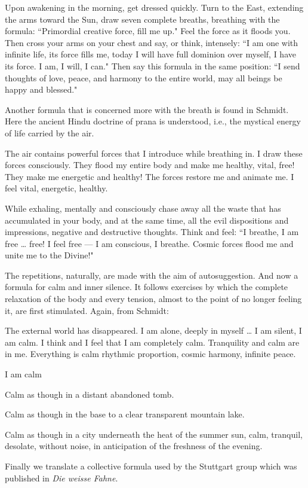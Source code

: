 \begin{quotex}
Upon awakening in the morning, get dressed quickly. Turn to the East, extending the arms toward the Sun, draw seven complete breaths, breathing with the formula: ``Primordial creative force, fill me up." Feel the force as it floods you. Then cross your arms on your chest and say, or think, intensely: ``I am one with infinite life, its force fills me, today I will have full dominion over myself, I have its force. I am, I will, I can." Then say this formula in the same position: ``I send thoughts of love, peace, and harmony to the entire world, may all beings be happy and blessed." 

\end{quotex}
Another formula that is concerned more with the breath is found in Schmidt. Here the ancient Hindu doctrine of prana is understood, i.e., the mystical energy of life carried by the air.

\begin{quotex}
The air contains powerful forces that I introduce while breathing in. I draw these forces consciously. They flood my entire body and make me healthy, vital, free! They make me energetic and healthy! The forces restore me and animate me. I feel vital, energetic, healthy.

While exhaling, mentally and consciously chase away all the waste that has accumulated in your body, and at the same time, all the evil dispositions and impressions, negative and destructive thoughts. Think and feel: ``I breathe, I am free … free! I feel free — I am conscious, I breathe. Cosmic forces flood me and unite me to the Divine!" 

\end{quotex}
The repetitions, naturally, are made with the aim of autosuggestion. And now a formula for calm and inner silence. It follows exercises by which the complete relaxation of the body and every tension, almost to the point of no longer feeling it, are first stimulated. Again, from Schmidt:

\begin{quotex}
The external world has disappeared. I am alone, deeply in myself … I am silent, I am calm. I think and I feel that I am completely calm. Tranquility and calm are in me. Everything is calm rhythmic proportion, cosmic harmony, infinite peace. 

I am calm

Calm as though in a distant abandoned tomb.

Calm as though in the base to a clear transparent mountain lake.

Calm as though in a city underneath the heat of the summer sun, calm, tranquil, desolate, without noise, in anticipation of the freshness of the evening. 

\end{quotex}
Finally we translate a collective formula used by the Stuttgart group which was published in \textit{Die weisse Fahne}.


